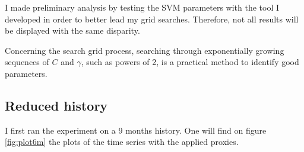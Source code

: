 \documentclass[11pt,a4paper,oneside]{book}
\begin{document}
I made preliminary analysis by testing the SVM parameters with the tool I developed in order to better lead my grid searches. Therefore, not all results will be displayed with the same disparity.

Concerning the search grid process, searching through exponentially growing sequences of $C$ and $\gamma$, such as powers of 2, is a practical method to identify good parameters. \cite{Hsu}


\subsection{Reduced history}

I first ran the experiment on a 9 months history. One will find on figure \ref{fig:plot6m} the plots of the time series with the applied proxies.
\end{document}
